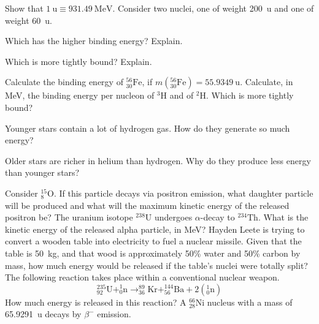 \documentclass[answers]{exam}
\theoremstyle{definition}
\begin{document}
\begin{questions}
  \question Show that $ \SI{1}{\amu} \equiv \SI{931.49}{\mega\electronvolt} $.
  \question Consider two nuclei, one of weight \SI{200}{\amu} and one of weight \SI{60}{\amu}.
    \begin{parts}
      \item Which has the higher binding energy? Explain.
      \item Which is more tightly bound? Explain.
    \end{parts}
  \question Calculate the binding energy of $ ^{56}_{30}\mathrm{Fe} $, if $ m(^{56}_{30}\mathrm{Fe}) = \SI{55.9349}{\amu} $.
  \question Calculate, in \si{\mega\electronvolt}, the binding energy per nucleon of $ ^3\mathrm{H} $ and of $ ^2\mathrm{H} $.
            Which is more tightly bound?
  \question
    \begin{parts}
      \item Younger stars contain a lot of hydrogen gas. How do they generate so much energy?
      \item Older stars are richer in helium than hydrogen. Why do they produce less energy than younger stars?
    \end{parts}
  \question Consider $ ^{15}_{8}\mathrm{O} $. If this particle decays via positron emission, what daughter
            particle will be produced and what will the maximum kinetic energy of the released positron be?
  \question The uranium isotope $ ^{238}\mathrm{U} $ undergoes $ \alpha$-decay to $ ^{234}\mathrm{Th} $. What
            is the kinetic energy of the released alpha particle, in \si{\mega\electronvolt}?
  \question Hayden Leete is trying to convert a wooden table into electricity to fuel a nuclear missile. Given
            that the table is \SI{50}{\kg}, and that wood is approximately 50\% water and 50\% carbon by mass,
            how much energy would be released if the table's nuclei were totally split?
  \question The following reaction takes place within a conventional nuclear weapon.
            \begin{displaymath}
              ^{235}_{92}\mathrm{U} + ^1_0\mathrm{n} \rightarrow ^{89}_{36}\mathrm{Kr} + ^{144}_{56}\mathrm{Ba} + 2\left(^{1}_0\mathrm{n}\right)
            \end{displaymath}
            How much energy is released in this reaction?
  \question A $ ^{66}_{28}\mathrm{Ni} $ nucleus with a mass of \SI{65.9291}{\amu} decays by $ \beta^- $ emission.
    \begin{parts}

\end{parts}
\end{questions}
\end{document}
